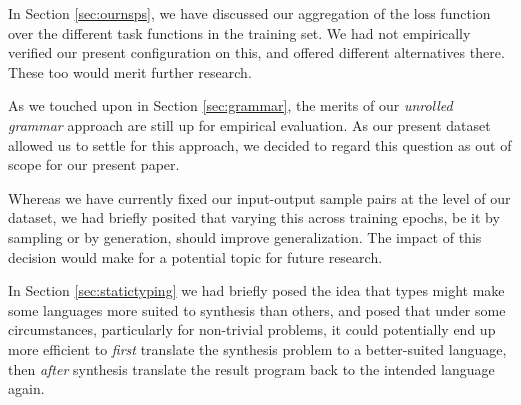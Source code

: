 \documentclass{article}
\begin{document}
    In Section \ref{sec:ournsps}, we have discussed our aggregation of
    the loss function over the different task functions in the training set.
    We had not empirically verified our present configuration on this,
    and offered different alternatives there.
    These too would merit further research.




    As we touched upon in Section \ref{sec:grammar},
    the merits of our \emph{unrolled grammar} approach are still up for empirical evaluation.
    As our present dataset allowed us to settle for this approach,
    we decided to regard this question as out of scope for our present paper.

    Whereas we have currently fixed our input-output sample pairs at the level of our dataset,
    we had briefly posited that varying this across training epochs,
    be it by sampling or by generation, should improve generalization.
    The impact of this decision would make for a potential topic for future research.    

    In Section \ref{sec:statictyping} we had briefly posed the idea that types might make some languages more suited to synthesis than others,
    and posed that under some circumstances,
    particularly for non-trivial problems,
    it could potentially end up more efficient 
    to \emph{first} translate the synthesis problem to a better-suited language,
    then \emph{after} synthesis translate the result program back to the intended language again.
\end{document}
